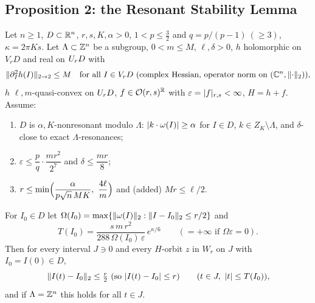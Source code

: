 \subsection{Proposition 2: the Resonant Stability Lemma}\label{bpN:p7:s-prop2}

\begin{proposition}\label{bpN:p7:resonant-prop2}
Let $n\ge1$, $D\subset\mathbb{R}^n$, $r,s,K,\alpha>0$, $1<p\le\frac32$ and $q=p/(p-1)\ (\ge3)$, $\kappa=2\pi Ks$. Let $\Lambda\subset\mathbb{Z}^n$ be a subgroup, $0<m\le M$, $\ell,\delta>0$, $h$ holomorphic on $V_rD$ and real on $U_{r}D$ with
\[\lVert \partial_I^2h(I)\rVert_{2\to2}\le M\quad\text{for all }I\in V_rD\ (\text{complex Hessian, operator norm on }(\mathbb{C}^n,\lVert \cdot\rVert_2)),\]
$h$ $\ell,m$-quasi-convex on $U_{r}D$, $f\in\mathcal O(r,s)^{\mathbb{R}}$ with $\varepsilon=\lvert f\rvert_{r,s}<\infty$, $H=h+f$. Assume:
\begin{enumerate}[label=(\alph*)]
\item $D$ is $\alpha,K$-nonresonant modulo $\Lambda$: $\lvert k\cdot\omega(I)\rvert\ge\alpha$ for $I\in D$, $k\in Z_K\setminus\Lambda$, and $\delta$-close to exact $\Lambda$-resonances;
\item $\varepsilon\le\dfrac pq\cdot\dfrac{mr^2}{2^7}$ and $\delta\le\dfrac{mr}8$;
\item $r\le\min\Bigl(\dfrac\alpha{p\sqrt n\,MK},\ \dfrac{4\ell}m\Bigr)$ and (added) $Mr\le\ell/2$.
\end{enumerate}
For $I_0\in D$ let $\Omega(I_0)=\max\{\lVert \omega(I)\rVert_2:\lVert I-I_0\rVert_2\le r/2\}$ and
\[T(I_0)=\frac{s\,m\,r^2}{288\,\Omega(I_0)\,\varepsilon}\,e^{\kappa/6}\qquad(=+\infty\text{ if }\Omega\varepsilon=0).\]
Then for every interval $J\ni0$ and every $H$-orbit $z$ in $W_r$ on $J$ with $I_0=I(0)\in D$,
\[\lVert I(t)-I_0\rVert_2\le\tfrac r2\ (\text{so }\lvert I(t)-I_0\rvert\le r)\qquad(t\in J,\ \lvert t\rvert\le T(I_0)),\]
and if $\Lambda=\mathbb{Z}^n$ this holds for all $t\in J$.
\end{proposition}
